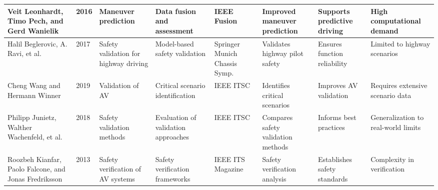 \documentclass[lettersize,journal]{IEEEtran}
\begin{document}
\begin{longtable}{|p{2cm}|p{1cm}|p{2cm}|p{2cm}|p{2cm}|p{2cm}|p{2cm}|p{2.5cm}|}
Veit Leonhardt, Timo Pech, and Gerd Wanielik & 2016 & Maneuver prediction & Data fusion and assessment & IEEE Fusion & Improved maneuver prediction & Supports predictive driving & High computational demand \\
\hline
Halil Beglerovic, A. Ravi, et al. & 2017 & Safety validation for highway driving & Model-based safety validation & Springer Munich Chassis Symp. & Validates highway pilot safety & Ensures function reliability & Limited to highway scenarios \\
\hline
Cheng Wang and Hermann Winner & 2019 & Validation of AV & Critical scenario identification & IEEE ITSC & Identifies critical scenarios & Improves AV validation & Requires extensive scenario data \\
\hline
Philipp Junietz, Walther Wachenfeld, et al. & 2018 & Safety validation methods & Evaluation of validation approaches & IEEE ITSC & Compares safety validation methods & Informs best practices & Generalization to real-world limits \\
\hline
Roozbeh Kianfar, Paolo Falcone, and Jonas Fredriksson & 2013 & Safety verification of AV systems & Safety verification frameworks & IEEE ITS Magazine & Safety verification analysis & Establishes safety standards & Complexity in verification \\
\hline


\end{longtable}
\end{document}
